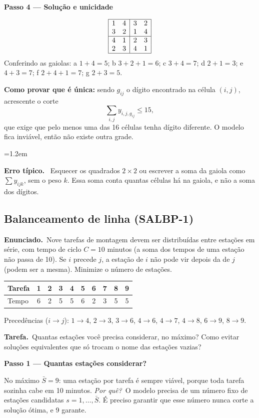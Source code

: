 \documentclass[11pt,a4paper]{article}
\newcommand{\enunciado}{\par\textbf{Enunciado.}\ }
\newcommand{\tarefa}{\par\textbf{Tarefa.}\ }
\newcommand{\passo}[1]{\par\medskip\textbf{#1}\par}
\newcommand{\porque}{\textit{Por quê?}\ }
\newenvironment{nota}[1]{\par\smallskip\begin{list}{}{\leftmargin=1.2em\rightmargin=0pt}\item[]\textbf{#1.}\ }{\end{list}}
\begin{document}
\passo{Passo 4 --- Solução e unicidade}
\[
\begin{array}{|cc|cc|}
\hline
1 & 4 & 3 & 2\\
3 & 2 & 1 & 4\\
\hline
4 & 1 & 2 & 3\\
2 & 3 & 4 & 1\\
\hline
\end{array}
\]
Conferindo as gaiolas: a $1+4=5$; b $3+2+1=6$; c $3+4=7$; d $2+1=3$; e $4+3=7$; f $2+4+1=7$; g $2+3=5$.

\textbf{Como provar que é única:} sendo $g_{ij}$ o dígito encontrado na célula $(i,j)$, acrescente o corte
\[
  \sum_{i,j} y_{i,j,g_{ij}} \le 15 ,
\]
que exige que pelo menos uma das 16 células tenha dígito diferente. O modelo fica inviável, então não existe outra grade.

\begin{nota}{Erro típico}
Esquecer os quadrados $2\times2$ ou escrever a soma da gaiola como $\sum y_{ijk}$, sem o peso $k$. Essa soma
conta quantas células há na gaiola, e não a soma dos dígitos.
\end{nota}

\subsection{Balanceamento de linha (SALBP-1)}
\enunciado Nove tarefas de montagem devem ser distribuídas entre estações em série, com tempo de ciclo
$C=10$ minutos (a soma dos tempos de uma estação não passa de 10). Se $i$ precede $j$, a estação de $i$ não pode
vir depois da de $j$ (podem ser a mesma). Minimize o número de estações.
\begin{center}
\begin{tabular}{lccccccccc}
\toprule
Tarefa & 1 & 2 & 3 & 4 & 5 & 6 & 7 & 8 & 9\\
\midrule
Tempo & 6 & 2 & 5 & 5 & 6 & 2 & 3 & 5 & 5\\
\bottomrule
\end{tabular}
\end{center}
Precedências ($i\to j$): $1\to4$, $2\to3$, $3\to6$, $4\to6$, $4\to7$, $4\to8$, $6\to9$, $8\to9$.

\tarefa Quantas estações você precisa considerar, no máximo? Como evitar soluções equivalentes que só trocam
o nome das estações vazias?

\passo{Passo 1 --- Quantas estações considerar?}
No máximo $\bar S=9$: uma estação por tarefa é sempre viável, porque toda tarefa sozinha cabe em 10 minutos.
\porque O modelo precisa de um número fixo de estações candidatas $s=1,\dots,\bar S$. É preciso garantir que esse
número nunca corte a solução ótima, e 9 garante.
\end{document}
